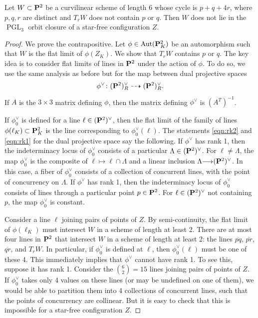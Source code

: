 \documentclass[reqno]{amsart}
\renewcommand{\to}{{\longrightarrow}}
\renewcommand {\P}{{\bf P}}
\providecommand{\PGL}{\operatorname{PGL}}
\providecommand{\Aut}{\operatorname{Aut}}
\numberwithin{equation}{section}
\begin{document}
\begin{proposition}\label{prop:pq4r}
  Let $W \subset \P^2$ be a curvilinear scheme of length 6 whose cycle is $p + q + 4r$, where $p,q,r$ are distinct and $T_rW$ does not contain $p$ or $q$.
  Then $W$ does not lie in the $\PGL_3$ orbit closure of a star-free configuration $Z$.
\end{proposition}
\begin{proof}
  We prove the contrapositive.
  Let $\phi \in \Aut(\P^2_K)$ be an automorphism such that $W$ is the flat limit of $\phi(Z_K)$.
  We show that $T_r W$ contains $p$ or $q$.
  The key idea is to consider flat limits of lines in $\P^2$ under the action of $\phi$.
  To do so, we use the same analysis as before but for the map between dual projective spaces
  \[\phi^{\vee} \colon (\P^2)_R^{\vee} \dashrightarrow (\P^2)_R^{\vee}.\]
  If $A$ is the $3 \times 3$ matrix defining $\phi$, then the matrix defining $\phi^{\vee}$ is $(A^T)^{-1}$.

  If $\phi_0^{\vee}$ is defined for a line $\ell \in (\P^2)^{\vee}$, then the flat limit of the family of lines $\phi(\ell_K) \subset \P^2_K$ is the line corresponding to $\phi_0^{\vee}(\ell)$.
  The statements \eqref{eqn:rk2} and \eqref{eqn:rk1} for the dual projective space say the following.
  If $\phi^{\vee}$ has rank 1, then the indeterminacy locus of $\phi^{\vee}_0$ consists of a particular $\Lambda \in (\P^2)^{\vee}$.
  For $\ell \neq \Lambda$, the map $\phi_0^{\vee}$ is the composite of $\ell \mapsto \ell \cap \Lambda$ and a linear inclusion $\Lambda \to (\P^2)^{\vee}$.
  In this case, a fiber of $\phi_0^{\vee}$ consists of a collection of concurrent lines, with the point of concurrency on $\Lambda$.
  If $\phi^{\vee}$ has rank 1, then the indeterminacy locus of $\phi^{\vee}_0$ consists of lines through a particular point $p \in \P^2$.
  For $\ell \in (\P^2)^{\vee}$ not containing $p$, the map $\phi_0^{\vee}$ is constant.

  Consider a line $\ell$ joining pairs of points of $Z$.
  By semi-continuity, the flat limit of $\phi(\ell_K)$ must intersect $W$ in a scheme of length at least 2.
  There are at most four lines in $\P^2$ that intersect $W$ in a scheme of length at least 2: the lines $\overline{pq}$, $\overline{pr}$, $\overline{qr}$, and $T_rW$.
  In particular, if $\phi_0^{\vee}$ is defined at $\ell$, then $\phi_0^{\vee}(\ell)$ must be one of these 4.
  This immediately implies that $\phi^{\vee}$ cannot have rank 1.
  To see this, suppose it has rank 1.
  Consider the ${6 \choose  2} = 15$ lines joining pairs of points of $Z$.
  If $\phi_0^{\vee}$ takes only 4 values on these lines (or may be undefined on one of them), we would be able to partition them into 4 collections of concurrent lines, such that the points of concurrency are collinear.
  But it is easy to check that this is impossible for a star-free configuration $Z$.


\end{proof}
\end{document}
